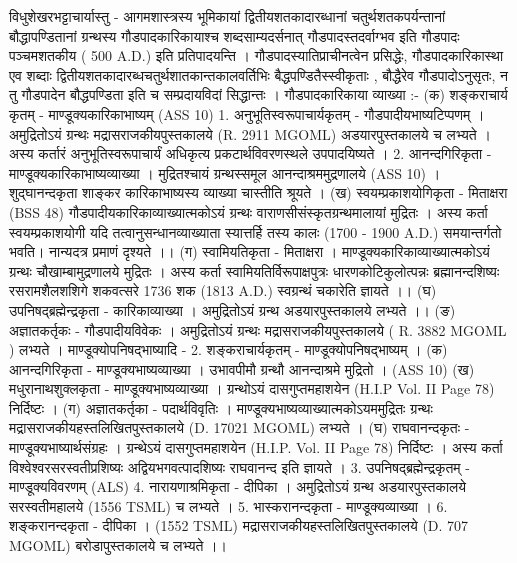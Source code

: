 विधुशेखरभट्टाचार्यास्तु - आगमशास्त्रस्य भूमिकायां द्वितीयशतकादारब्धानां चतुर्थशतकपर्यन्तानां बौद्धापण्डितानां ग्रन्थस्य गौडपादकारिकायाश्च शब्दसाम्यदर्सनात् गौडपादस्तदर्वाग्भव इति गौडपादः पञ्चमशतकीय ( 500 A.D.) इति प्रतिपादयन्ति । 
गौडपादस्यातिप्राचीनत्वेन प्रसिद्धेः, गौडपादकारिकास्था एव शब्दाः द्वितीयशतकादारब्धचतुर्थशातकान्तकालवर्तिभिः बैद्धपण्डितैस्स्वीकृताः , बौद्धैरेव गौडपादोऽनुसृतः, न तु गौडपादेन बौद्धपण्डिता इति च सम्प्रदायविदां सिद्धान्तः । गौडपादकारिकाया व्याख्या :-
(क) शङ्कराचार्य कृतम् - माण्डूक्यकारिकाभाष्यम् (ASS 10) 
1.  अनुभूतिस्वरूपाचार्यकृतम् - गौडपादीयभाष्यटिप्पणम् ।
अमुद्रितोऽयं ग्रन्थः मद्रासराजकीयपुस्तकालये (R. 2911 MGOML)  अडयारपुस्तकालये च लभ्यते । अस्य कर्तारं अनुभूतिस्वरूपाचार्यं अधिकृत्य प्रकटार्थविवरणस्थले उपपादयिष्यते ।
2. आनन्दगिरिकृता - माण्डूक्यकारिकाभाष्यव्याख्या । मुद्रितश्चायं ग्रन्थस्समूल आनन्दाश्रममुद्रणालये (ASS 10) । शुद्घानन्दकृता शाङ्कर कारिकाभाष्यस्य व्याख्या चास्तीति श्रूयते । 
(ख) स्वयम्प्रकाशयोगिकृता - मिताक्षरा (BSS 48)  
गौडपादीयकारिकाव्याख्यात्मकोऽयं ग्रन्थः वाराणसीसंस्कृतग्रन्थमालायां मुद्रितः । अस्य कर्ता स्वयम्प्रकाशयोगी यदि तत्वानुसन्धानव्याख्याता स्यात्तर्हि तस्य कालः (1700 - 1900 A.D.) समयान्तर्गतो भवति। नान्यदत्र प्रमाणं दृश्यते ।। 
 (ग) स्वामियतिकृता - मिताक्षरा । 
 माण्डूक्यकारिकाव्याख्यात्मकोऽयं ग्रन्थः चौखाम्बामुद्रणालये मुद्रितः । अस्य कर्ता स्वामियतिर्विरूपाक्षपुत्रः धारणकोटिकुलोत्पन्नः ब्रह्मानन्दशिष्यः रसरामशैलशशिगे शकवत्सरे 1736 शक (1813 A.D.) स्वग्रन्थं चकारेति ज्ञायते ।।
 (घ) उपनिषद्ब्रह्मेन्द्रकृता - कारिकाव्याख्या । अमुद्रितोऽयं ग्रन्थ अडयारपुस्तकालये लभ्यते ।।
 (ङ) अज्ञातकर्तृकः - गौडपादीयविवेकः । अमुद्रितोऽयं ग्रन्थः मद्रासराजकीयपुस्तकालये ( R. 3882 MGOML ) लभ्यते । माण्डूक्योपनिषद्भाष्यादि -
 2. शङ्कराचार्यकृतम् - माण्डूक्योपनिषद्भाष्यम् ।
 (क) आनन्दगिरिकृता - माण्डूक्यभाष्यव्याख्या । उभावपीमौ ग्रन्थौ आनन्दाश्रमे मुद्रितो । (ASS 10) 
 (ख) मधुरानाथशुक्लकृता - माण्डूक्यभाष्यव्याख्या । ग्रन्थोऽयं दासगुप्तमहाशयेन (H.I.P Vol. II Page 78) निर्दिष्टः । 
 (ग) अज्ञातकर्तृका - पदार्थविवृतिः । माण्डूक्यभाष्यव्याख्यात्मकोऽयममुद्रितः ग्रन्थः मद्रासराजकीयहस्तलिखितपुस्तकालये (D. 17021 MGOML) लभ्यते । 
 (घ) राघवानन्दकृतः - माण्डूक्यभाष्यार्थसंग्रहः ।
 ग्रन्थेऽयं दासगुप्तमहाशयेन (H.I.P. Vol. II Page 78)  निर्दिष्टः । अस्य कर्ता विश्वेश्वरसरस्वतीप्रशिष्यः अद्वियभगवत्पादशिष्यः राघवानन्द इति ज्ञायते । 
 3. उपनिषद्ब्रह्मेन्द्रकृतम् - माण्डूक्यविवरणम् (ALS) 
 4. नारायणाश्रमिकृता - दीपिका । अमुद्रितोऽयं ग्रन्थ अडयारपुस्तकालये सरस्वतीमहालये (1556 TSML) च लभ्यते ।  
 5. भास्करानन्दकृता - माण्डूक्यव्याख्या । 
 6. शङ्करानन्दकृता - दीपिका । (1552 TSML) मद्रासराजकीयहस्तलिखितपुस्तकालये (D. 707 MGOML) बरोडापुस्तकालये च लभ्यते ।। 
 
